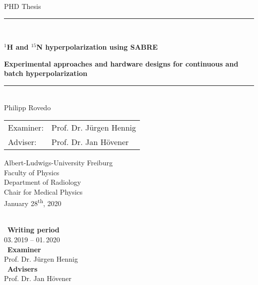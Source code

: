 
\begin{titlepage}
\begin{center}

\newcommand{\HorizontalLine}{\rule{\linewidth}{0.3mm}}

{\Large PHD Thesis}\\[1.3cm]


\HorizontalLine \\[0.4cm]
\begin{spacing}{3}
    {\huge \bfseries $^1$H and $^{15}$N hyperpolarization using SABRE} \\
\end{spacing}
\begin{spacing}{2}
    {\Large \bfseries Experimental approaches and hardware designs for continuous and batch hyperpolarization}\\
\end{spacing}
\HorizontalLine \\[1.5cm]


	{\Huge Philipp Rovedo} \\[2cm]


\begin{tabular}[hc]{>{\huge}l >{\huge}l}
  Examiner: & Prof. Dr. J\"urgen Hennig \\[0.3cm]
  Adviser: & Prof. Dr. Jan H\"ovener \\[1.2cm]
\end{tabular}
\vfill  %

\Large {
    Albert-Ludwigs-University Freiburg\\
    Faculty of Physics\\
    Department of Radiology\\
    Chair for Medical Physics\\[1cm]

    January 28\textsuperscript{th}, 2020\\
}
\end{center}
\end{titlepage}

\ \vfill \ \\  %
\
\textbf{Writing period}            \smallskip{} \\
03.\,2019 -- 01.\,2020   \bigskip{} \\
\
\textbf{Examiner}                  \smallskip{} \\
Prof. Dr. J\"urgen Hennig               \bigskip{} \\
\
\textbf{Advisers}                  \smallskip{} \\
Prof. Dr. Jan H\"ovener
